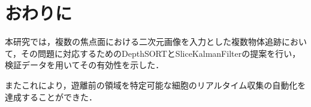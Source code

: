\section{おわりに}

本研究では，複数の焦点面における二次元画像を入力とした複数物体追跡において，その問題に対応するためのDepthSORTとSliceKalmanFilterの提案を行い，検証データを用いてその有効性を示した．

またこれにより，遊離前の領域を特定可能な細胞のリアルタイム収集の自動化を達成することができた．